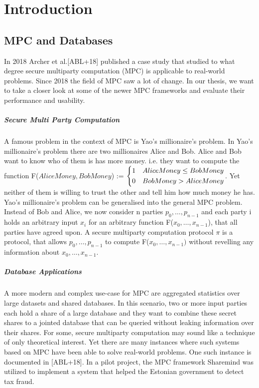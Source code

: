 \chapter {Introduction}
\section{MPC and Databases}
In 2018 Archer et al.[ABL+18] published a case study that studied to what degree secure multiparty computation (MPC) is applicable to real-world problems. Since 2018 the field of MPC saw a lot of change. In our thesis, we want to take a closer look at some of the newer MPC frameworks and evaluate their performance and usability. 
\paragraph{Secure Multi Party Computation}
A famous problem in the context of MPC is Yao's millionaire's problem. In Yao's millionaire's problem there are two millionaires Alice and Bob. Alice and Bob want to know who of them is has more money. i.e. they want to compute the function F($AliceMoney,BobMoney$) := $ 
\begin{dcases} 
	1  &  AliceMoney \leq  BobMoney \\
	0  &  BobMoney > AliceMoney  \\
\end{dcases}  $. Yet neither of them is willing to trust the other and tell him how much money he has. 
Yao's millionaire's problem can be generalised into the general MPC problem.  Instead of Bob and Alice, we now consider n parties $ p_0,\dots,p_{n-1} $ and each party i holds an arbitrary input  $ x_i $ for an arbitrary function F($ x_0,\dots,x_{n-1}$),  that all parties have agreed upon.  
A secure multiparty computation protocol $ \pi $  is a protocol, that allows  $ p_0,\dots,p_{n-1} $ to compute F($x_0,\dots,x_{n-1} )$ without revelling any information about $ x_0,\dots,x_{n-1}. $
\paragraph{Database Applications}
A more modern and complex use-case for MPC are aggregated statistics over large
datasets and shared databases. In this scenario, two or more input parties each hold
a share of a large database and they want to combine these secret shares to a jointed
database that can be queried without leaking information over their shares. For some, secure multiparty computation may sound like a technique of only theoretical interest. Yet there are many instances where such systems based on MPC have been
able to solve real-world problems. One such instance is documented in [ABL+18]. In a pilot project, the MPC framework Sharemind was utilized to implement a system that helped the Estonian government to detect tax fraud.





